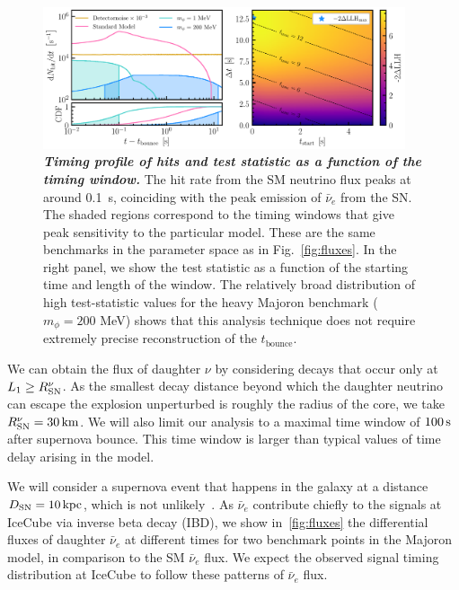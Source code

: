 \documentclass[aps,twocolumn,prl,showpacs,showkeys,preprintnumbers,superscriptaddress,nobibnotes,floatfix,longbibliography,notitlepage,nofootinbib]{revtex4-2}
\begin{document}
\begin{figure}[t]
    \centering
    \includegraphics[width=0.95\textwidth]{figures/hits_and_likelihood.pdf}
    \caption{\textbf{\textit{Timing profile of hits and test statistic as a function of the timing window.}}
    The hit rate from the SM neutrino flux peaks at around 0.1~s, coinciding with the peak emission of $\bar{\nu}_{e}$ from the SN.
    The shaded regions correspond to the timing windows that give peak sensitivity to the particular model. These are the same benchmarks in the parameter space as in Fig.~\ref{fig:fluxes}.
    In the right panel, we show the test statistic as a function of the starting time and length of the window.
    The relatively broad distribution of high test-statistic values for the heavy Majoron benchmark ($m_\phi=200$ MeV) shows that this analysis technique does not require extremely precise reconstruction of the $t_{\mathrm{bounce}}$.
    }
    \label{fig:hits_and_likelihood}
\end{figure}

We can obtain the flux of daughter $\nu$ by considering decays that occur only at $L_1\geq R^{\nu}_{\rm SN}$.
As the smallest decay distance beyond which the daughter neutrino can escape the explosion unperturbed is roughly the radius of the core, we take $R^{\nu}_{\rm SN} = \unit[30]{km}$.
We will also limit our analysis to a maximal time window of $\unit[100]{s}$ after supernova bounce.
This time window is larger than typical values of time delay arising in the model.

We will consider a supernova event that happens in the galaxy at a distance $D_{\rm SN}=\unit[10]{kpc}$, which is not unlikely~\cite{Reed:2005en,Rozwadowska:2020nab}.
As $\bar{\nu}_e$ contribute chiefly to the signals at IceCube via inverse beta decay (IBD), we show in~\cref{fig:fluxes} the differential fluxes of daughter $\bar{\nu}_e$ at different times for two benchmark points in the Majoron model, in comparison to the SM $\bar{\nu}_e$ flux.
We expect the observed signal timing distribution at IceCube to follow these patterns of $\bar{\nu}_{e}$ flux. 
\end{document}
